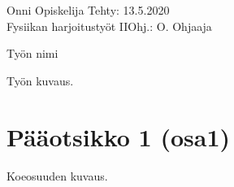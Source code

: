 \documentclass[a4paper,12pt]{article}
\begin{document}
\noindent Onni Opiskelija \hfill Tehty: 13.5.2020\\%
Fysiikan harjoitustyöt II\hfill Ohj.: O. Ohjaaja \\%



\vspace{1cm} %
\begin{center}
\huge{Työn nimi} %
\end{center}
\vspace{1.2cm}


\noindent Työn kuvaus. %


\section{Pääotsikko 1 (osa1)} %

Koeosuuden kuvaus. %

\end{document}

